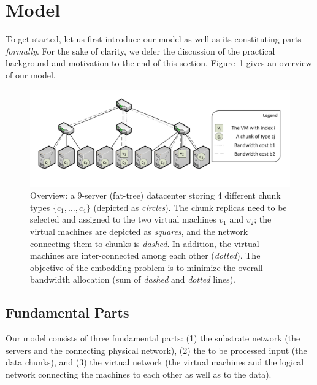 \documentclass[9pt]{sigcomm-alternate}
\begin{document}
\section{Model}\label{sec:model}

To get started, let us first introduce our model as well as its constituting parts \emph{formally}.
For the sake of clarity, we defer the discussion of the practical background and motivation
to the end of this section. Figure~\ref{fig:overview} gives an overview of our model.

\begin{figure}[t]
\centering
\includegraphics[width=0.99\columnwidth]{figs/overview-fig.pdf}
\caption{Overview: a 9-server (fat-tree) datacenter storing 4 different chunk
types $\{c_1,\ldots,c_4\}$ (depicted as \emph{circles}). The chunk replicas need to be selected and assigned to the two
 virtual machines $v_1$ and $v_2$; the virtual machines are depicted as \emph{squares}, and
 the network connecting them to chunks is \emph{dashed}. In addition, the virtual machines are inter-connected among
 each other (\emph{dotted}). The objective of the embedding problem is to minimize the overall bandwidth allocation
 (sum of \emph{dashed} and \emph{dotted} lines).}
\label{fig:overview}
\end{figure}



\subsection{Fundamental Parts}

Our model consists of three fundamental parts: (1) the substrate network (the servers
and the connecting physical network),
(2) the to be processed input (the data chunks), and
(3) the virtual network (the virtual machines and the logical network connecting the machines to each other
as well as to the data).
\end{document}
